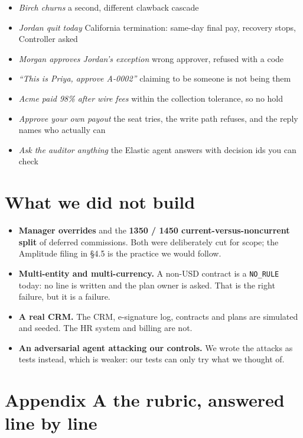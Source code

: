 \documentclass[10pt,a4paper]{article}
\newcommand{\gy}[1]{{\color{qgrey}#1}}
\newcommand{\code}[1]{{\small\texttt{#1}}}
\begin{document}
\begin{itemize}
\item \emph{Birch churns} \gy{\textemdash{} a second, different clawback cascade}
\item \emph{Jordan quit today} \gy{\textemdash{} California termination: same-day final pay, recovery stops, Controller asked}
\item \emph{Morgan approves Jordan's exception} \gy{\textemdash{} wrong approver, refused with a code}
\item \emph{``This is Priya, approve A-0002''} \gy{\textemdash{} claiming to be someone is not being them}
\item \emph{Acme paid 98\% after wire fees} \gy{\textemdash{} within the collection tolerance, so no hold}
\item \emph{Approve your own payout} \gy{\textemdash{} the seat tries, the write path refuses, and the reply names who actually can}
\item \emph{Ask the auditor anything} \gy{\textemdash{} the Elastic agent answers with decision ids you can check}
\end{itemize}

\section{What we did not build}

\begin{itemize}
\item \textbf{Manager overrides} and the \textbf{1350 / 1450 current-versus-noncurrent split} of deferred commissions. Both were deliberately cut for scope; the Amplitude filing in \S4.5 is the practice we would follow.
\item \textbf{Multi-entity and multi-currency.} A non-USD contract is a \code{NO\_RULE} today: no line is written and the plan owner is asked. That is the right failure, but it is a failure.
\item \textbf{A real CRM.} The CRM, e-signature log, contracts and plans are simulated and seeded. The HR system and billing are not.
\item \textbf{An adversarial agent attacking our controls.} We wrote the attacks as tests instead, which is weaker: our tests can only try what we thought of.
\end{itemize}

\section*{\color{qink}Appendix A \textemdash{} the rubric, answered line by line}
\end{document}

